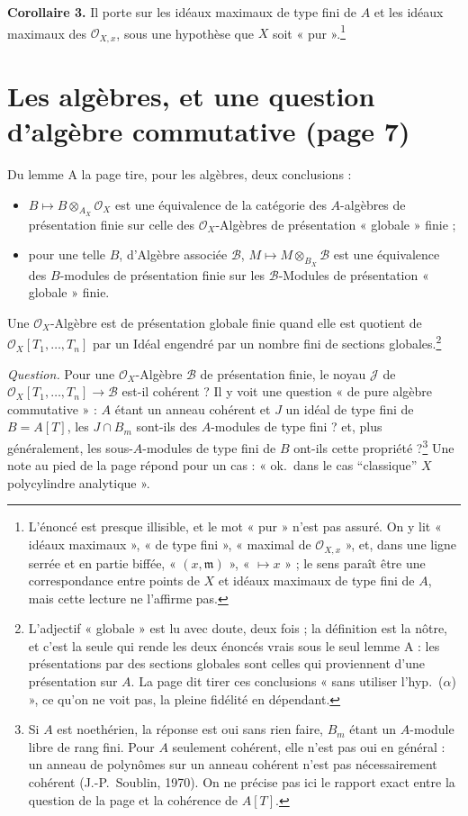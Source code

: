 \documentclass[11pt,a4paper]{article}
\begin{document}
\textbf{Corollaire 3.} Il porte sur les idéaux maximaux de type fini de $A$ et
les idéaux maximaux des $\mathcal{O}_{X,x}$, sous une hypothèse que $X$ soit
« pur ».\footnote{L'énoncé est presque illisible, et le mot « pur » n'est pas
assuré. On y lit « idéaux maximaux », « de type fini », « maximal de
$\mathcal{O}_{X,x}$ », et, dans une ligne serrée et en partie biffée,
« $(x, \mathfrak{m})$ », « $\mapsto x$ » ; le sens paraît être une
correspondance entre points de $X$ et idéaux maximaux de type fini de $A$,
mais cette lecture ne l'affirme pas.}

\section*{Les algèbres, et une question d'algèbre commutative (page 7)}

Du lemme A la page tire, pour les algèbres, deux conclusions :
\begin{itemize}
\item $B \mapsto B \otimes_{A_{X}} \mathcal{O}_{X}$ est une équivalence de la
catégorie des $A$-algèbres de présentation finie sur celle des
$\mathcal{O}_{X}$-Algèbres de présentation « globale » finie ;
\item pour une telle $B$, d'Algèbre associée $\mathcal{B}$,
$M \mapsto M \otimes_{B_{X}} \mathcal{B}$ est une équivalence des $B$-modules
de présentation finie sur les $\mathcal{B}$-Modules de présentation
« globale » finie.
\end{itemize}
Une $\mathcal{O}_{X}$-Algèbre est de présentation globale finie quand elle est
quotient de $\mathcal{O}_{X}[T_{1}, \ldots, T_{n}]$ par un Idéal engendré par
un nombre fini de sections globales.\footnote{L'adjectif « globale » est lu
avec doute, deux fois ; la définition est la nôtre, et c'est la seule qui
rende les deux énoncés vrais sous le seul lemme A : les présentations par des
sections globales sont celles qui proviennent d'une présentation sur $A$.
La page dit tirer ces conclusions « sans utiliser l'hyp.\ ($\alpha$) », ce
qu'on ne voit pas, la pleine fidélité en dépendant.}

\emph{Question.} Pour une $\mathcal{O}_{X}$-Algèbre $\mathcal{B}$ de
présentation finie, le noyau $\mathcal{J}$ de
$\mathcal{O}_{X}[T_{1}, \ldots, T_{n}] \to \mathcal{B}$ est-il cohérent ? Il y
voit une question « de pure algèbre commutative » : $A$ étant un anneau
cohérent et $J$ un idéal de type fini de $B = A[T]$, les
$J \cap B_{m}$ sont-ils des $A$-modules de type fini ? et, plus généralement,
les sous-$A$-modules de type fini de $B$ ont-ils cette
propriété ?\footnote{Si $A$ est noethérien, la réponse est oui sans rien
faire, $B_{m}$ étant un $A$-module libre de rang fini. Pour $A$ seulement
cohérent, elle n'est pas oui en général : un anneau de polynômes sur un anneau
cohérent n'est pas nécessairement cohérent (J.-P.~Soublin, 1970). On ne
précise pas ici le rapport exact entre la question de la page et la cohérence
de $A[T]$.} Une note au pied de la page répond pour un cas : « ok.\ dans le cas
“classique” $X$ polycylindre analytique ».
\end{document}
